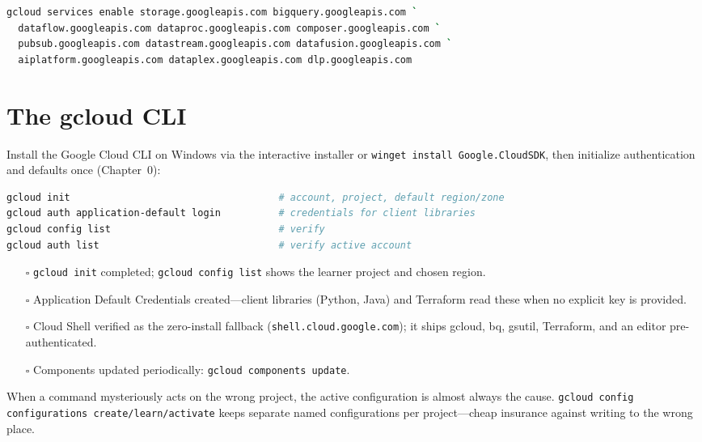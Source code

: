 \begin{lstlisting}[language=bash,caption={Enabling the most common service APIs used across the book.},label={lst:appB-enable-apis}]
gcloud services enable storage.googleapis.com bigquery.googleapis.com `
  dataflow.googleapis.com dataproc.googleapis.com composer.googleapis.com `
  pubsub.googleapis.com datastream.googleapis.com datafusion.googleapis.com `
  aiplatform.googleapis.com dataplex.googleapis.com dlp.googleapis.com
\end{lstlisting}

\section{The gcloud CLI}
%
Install the Google Cloud CLI on Windows via the interactive installer or
\texttt{winget install Google.CloudSDK}, then initialize authentication and defaults once
(Chapter~0):

\begin{lstlisting}[language=PowerShell,caption={One-time CLI initialization from PowerShell.},label={lst:appB-gcloud-init}]
gcloud init                                    # account, project, default region/zone
gcloud auth application-default login          # credentials for client libraries
gcloud config list                             # verify
gcloud auth list                               # verify active account
\end{lstlisting}

\begin{itemize}
    \item[$\square$] \texttt{gcloud init} completed; \texttt{gcloud config list} shows the
    learner project and chosen region.
    \item[$\square$] Application Default Credentials created---client libraries (Python, Java)
    and Terraform read these when no explicit key is provided.
    \item[$\square$] Cloud Shell verified as the zero-install fallback
    (\texttt{shell.cloud.google.com}); it ships gcloud, bq, gsutil, Terraform, and an editor
    pre-authenticated.
    \item[$\square$] Components updated periodically: \texttt{gcloud components update}.
\end{itemize}

\begin{tipbox}
When a command mysteriously acts on the wrong project, the active configuration is almost always
the cause. \texttt{gcloud config configurations create/learn/activate} keeps separate named
configurations per project---cheap insurance against writing to the wrong place.
\end{tipbox}

